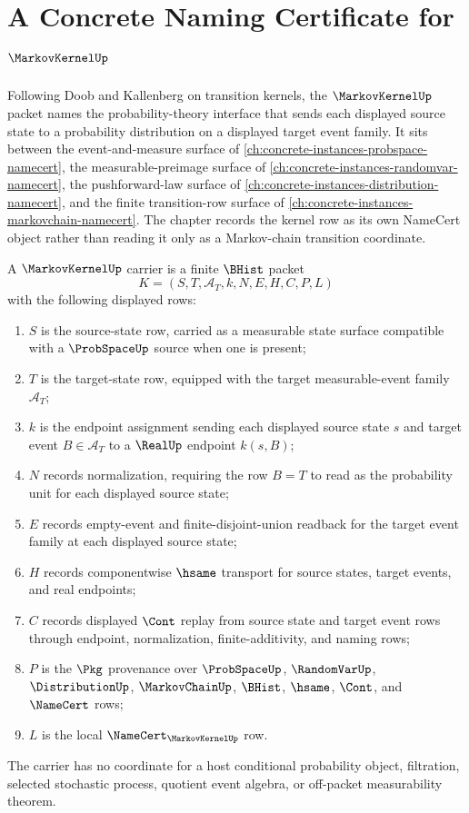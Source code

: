 \chapter{A Concrete Naming Certificate for $\MarkovKernelUp$}
\label{ch:concrete-instances-markovkernel-namecert}

Following Doob and Kallenberg on transition kernels, the $\MarkovKernelUp$ packet names the probability-theory interface that sends each displayed source state to a probability distribution on a displayed target event family. It sits between the event-and-measure surface of \autoref{ch:concrete-instances-probspace-namecert}, the measurable-preimage surface of \autoref{ch:concrete-instances-randomvar-namecert}, the pushforward-law surface of \autoref{ch:concrete-instances-distribution-namecert}, and the finite transition-row surface of \autoref{ch:concrete-instances-markovchain-namecert}. The chapter records the kernel row as its own NameCert object rather than reading it only as a Markov-chain transition coordinate.

\begin{definition}
\label{def:markov-kernel-carrier}
A $\MarkovKernelUp$ carrier is a finite $\BHist$ packet
$$
K=(S,T,\mathcal{A}_T,k,N,E,H,C,P,L)
$$
with the following displayed rows:
\begin{enumerate}
\item $S$ is the source-state row, carried as a measurable state surface compatible with a $\ProbSpaceUp$ source when one is present;
\item $T$ is the target-state row, equipped with the target measurable-event family $\mathcal{A}_T$;
\item $k$ is the endpoint assignment sending each displayed source state $s$ and target event $B\in\mathcal{A}_T$ to a $\RealUp$ endpoint $k(s,B)$;
\item $N$ records normalization, requiring the row $B=T$ to read as the probability unit for each displayed source state;
\item $E$ records empty-event and finite-disjoint-union readback for the target event family at each displayed source state;
\item $H$ records componentwise $\hsame$ transport for source states, target events, and real endpoints;
\item $C$ records displayed $\Cont$ replay from source state and target event rows through endpoint, normalization, finite-additivity, and naming rows;
\item $P$ is the $\Pkg$ provenance over $\ProbSpaceUp$, $\RandomVarUp$, $\DistributionUp$, $\MarkovChainUp$, $\BHist$, $\hsame$, $\Cont$, and $\NameCert$ rows;
\item $L$ is the local $\NameCert_{\MarkovKernelUp}$ row.
\end{enumerate}
The carrier has no coordinate for a host conditional probability object, filtration, selected stochastic process, quotient event algebra, or off-packet measurability theorem.
\end{definition}

